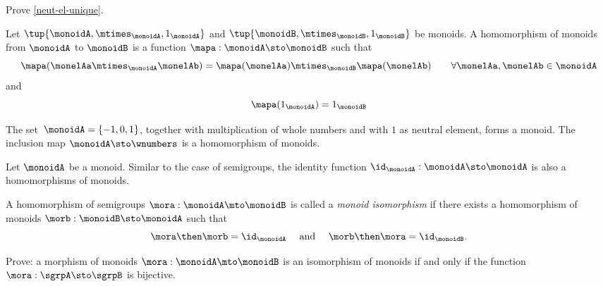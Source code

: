 \begin{exercise}
Prove \cref{neut-el-unique}. 
\end{exercise}

\begin{definition}
  \label{def:monoid-mor}
Let $\tup{\monoidA, \mtimes_\monoidA, 1_\monoidA}$ and $\tup{\monoidB, \mtimes_\monoidB, 1_\monoidB}$ be monoids. A homomorphism of monoids from $\monoidA$ to $\monoidB$ is a function $\mapa : \monoidA \sto \monoidB$ such that
\begin{equation}\label{mon-mor-comp}
\mapa (\monelAa \mtimes_{\monoidA} \monelAb) = \mapa (\monelAa) \mtimes_{\monoidB}  \mapa(\monelAb) \quad \quad \forall \monelAa, \monelAb \in \monoidA
\end{equation}
and 
\begin{equation}\label{mon-id-comp}
\mapa (1_\monoidA) = 1_{\monoidB}
\end{equation}
\end{definition}

\begin{example}
The set~$\monoidA = \{ -1, 0, 1 \}$, together with multiplication of whole numbers and with $1$ as neutral element, forms a monoid. The inclusion map $ \monoidA \sto \wnumbers$ is a homomorphism of monoids. 
 \end{example}


\begin{definition}
  \label{def:identity-mon-mor}
Let $\monoidA$ be a monoid. Similar to the case of semigroups, the identity function $\id_\monoidA: \monoidA \sto \monoidA$ is also a homomorphisms of monoids.  
\end{definition}



\begin{definition}
  \label{def:monoid-iso}
A homomorphism of semigroups $\mora: \monoidA \mto \monoidB$ is called a \emph{monoid isomorphism} if there exists a homomorphism of monoids $\morb: \monoidB \sto \monoidA$ such that 
\begin{equation}\label{sgrp-iso-cond}
\mora \then \morb = \id_\monoidA \quad \text{ and } \quad  \morb \then \mora = \id_\monoidB. 
\end{equation} 
\end{definition}


\begin{exercise}
Prove: a morphism of monoids $\mora: \monoidA \mto \monoidB$ is an isomorphism of monoids if and only if the function $\mora: \sgrpA \sto \sgrpB$ is bijective. 
\end{exercise}

